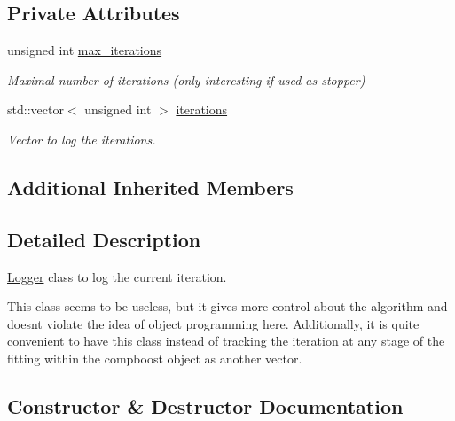 \subsection*{Private Attributes}
\begin{DoxyCompactItemize}
\item 
unsigned int \hyperlink{classlogger_1_1_logger_iteration_a30cfbf3c8c363807826b754f19195c44}{max\+\_\+iterations}
\begin{DoxyCompactList}\small\item\em Maximal number of iterations (only interesting if used as stopper) \end{DoxyCompactList}\item 
std\+::vector$<$ unsigned int $>$ \hyperlink{classlogger_1_1_logger_iteration_a3879ea4e72c8626df033b5345e392fd9}{iterations}
\begin{DoxyCompactList}\small\item\em Vector to log the iterations. \end{DoxyCompactList}\end{DoxyCompactItemize}
\subsection*{Additional Inherited Members}


\subsection{Detailed Description}
\hyperlink{classlogger_1_1_logger}{Logger} class to log the current iteration. 

This class seems to be useless, but it gives more control about the algorithm and doesn\textquotesingle{}t violate the idea of object programming here. Additionally, it is quite convenient to have this class instead of tracking the iteration at any stage of the fitting within the compboost object as another vector. 

\subsection{Constructor \& Destructor Documentation}
\mbox{\label{classlogger_1_1_logger_iteration_a79ab91e7e508f56cbfac3d670a79987c}} 
